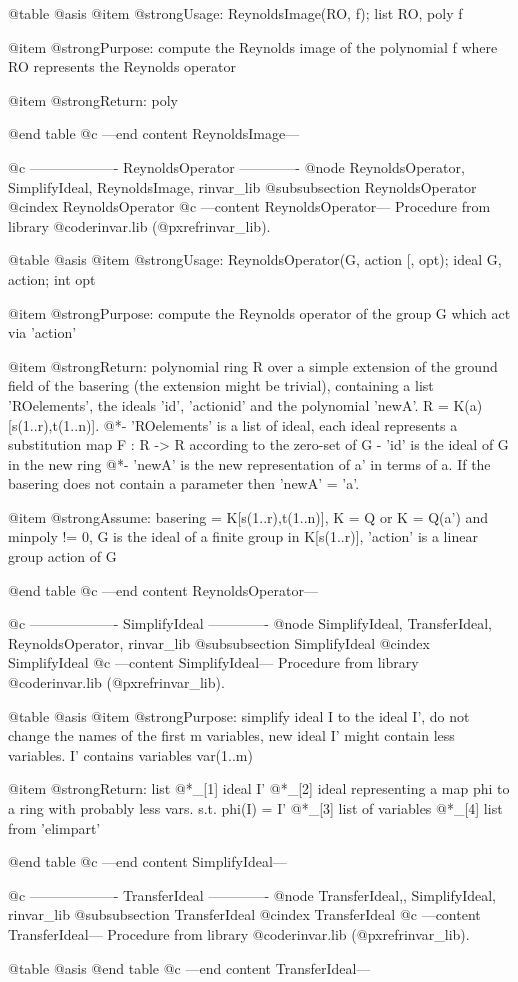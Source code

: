 @table @asis
@item @strong{Usage:}
ReynoldsImage(RO, f); list RO, poly f

@item @strong{Purpose:}
compute the Reynolds image of the polynomial f where RO represents
the Reynolds operator

@item @strong{Return:}
poly

@end table
@c ---end content ReynoldsImage---

@c ------------------- ReynoldsOperator -------------
@node ReynoldsOperator, SimplifyIdeal, ReynoldsImage, rinvar_lib
@subsubsection ReynoldsOperator
@cindex ReynoldsOperator
@c ---content ReynoldsOperator---
Procedure from library @code{rinvar.lib} (@pxref{rinvar_lib}).

@table @asis
@item @strong{Usage:}
ReynoldsOperator(G, action [, opt); ideal G, action; int opt

@item @strong{Purpose:}
compute the Reynolds operator of the group G which act via 'action'

@item @strong{Return:}
polynomial ring R over a simple extension of the ground field of the
basering (the extension might be trivial), containing a list
'ROelements', the ideals 'id', 'actionid' and the polynomial 'newA'.
R = K(a)[s(1..r),t(1..n)].
@*- 'ROelements' is a list of ideal, each ideal represents a
substitution map F : R -> R according to the zero-set of G
- 'id' is the ideal of G in the new ring
@*- 'newA' is the new representation of a' in terms of a. If the
basering does not contain a parameter then 'newA' = 'a'.

@item @strong{Assume:}
basering = K[s(1..r),t(1..n)], K = Q or K = Q(a') and minpoly != 0,
G is the ideal of a finite group in K[s(1..r)], 'action' is a linear
group action of G

@end table
@c ---end content ReynoldsOperator---

@c ------------------- SimplifyIdeal -------------
@node SimplifyIdeal, TransferIdeal, ReynoldsOperator, rinvar_lib
@subsubsection SimplifyIdeal
@cindex SimplifyIdeal
@c ---content SimplifyIdeal---
Procedure from library @code{rinvar.lib} (@pxref{rinvar_lib}).

@table @asis
@item @strong{Purpose:}
simplify ideal I to the ideal I', do not change the names of the
first m variables, new ideal I' might contain less variables.
I' contains variables var(1..m)

@item @strong{Return:}
list
@*_[1] ideal I'
@*_[2] ideal representing a map phi to a ring with probably less vars. s.t.
phi(I) = I'
@*_[3] list of variables
@*_[4] list from 'elimpart'

@end table
@c ---end content SimplifyIdeal---

@c ------------------- TransferIdeal -------------
@node TransferIdeal,, SimplifyIdeal, rinvar_lib
@subsubsection TransferIdeal
@cindex TransferIdeal
@c ---content TransferIdeal---
Procedure from library @code{rinvar.lib} (@pxref{rinvar_lib}).

@table @asis
@end table
@c ---end content TransferIdeal---

